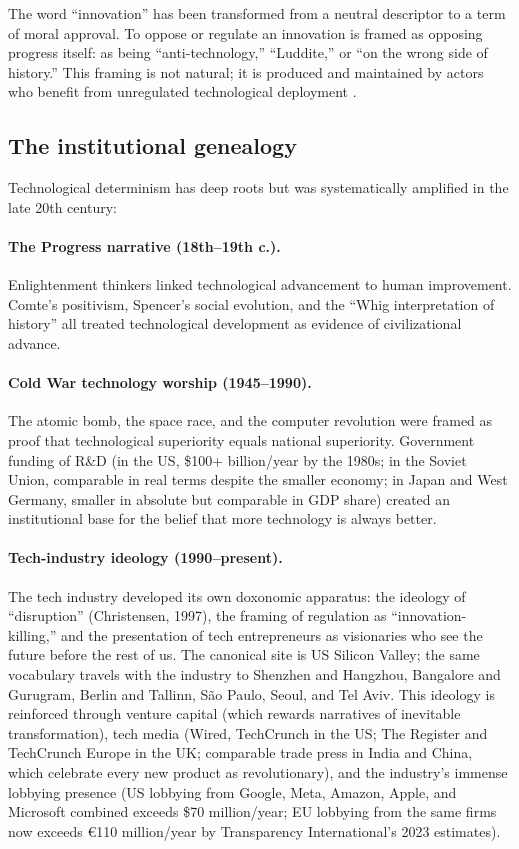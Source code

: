 The word ``innovation'' has been transformed from a neutral descriptor to a term of moral approval.
To oppose or regulate an innovation is framed as opposing progress itself: as being ``anti-technology,'' ``Luddite,'' or ``on the wrong side of history.''
This framing is not natural; it is produced and maintained by actors who benefit from unregulated technological deployment \autocite{winner1986}.

\subsection{The institutional genealogy}

Technological determinism has deep roots but was systematically amplified in the late 20th century:

\paragraph{The Progress narrative (18th--19th c.).}
Enlightenment thinkers linked technological advancement to human improvement.
Comte's positivism, Spencer's social evolution, and the ``Whig interpretation of history'' all treated technological development as evidence of civilizational advance.

\paragraph{Cold War technology worship (1945--1990).}
The atomic bomb, the space race, and the computer revolution were framed as proof that technological superiority equals national superiority.
Government funding of R\&D (in the US, \$100+ billion/year by the 1980s; in the Soviet Union, comparable in real terms despite the smaller economy; in Japan and West Germany, smaller in absolute but comparable in GDP share) created an institutional base for the belief that more technology is always better.

\paragraph{Tech-industry ideology (1990--present).}
The tech industry developed its own doxonomic apparatus: the ideology of ``disruption'' (Christensen, 1997), the framing of regulation as ``innovation-killing,'' and the presentation of tech entrepreneurs as visionaries who see the future before the rest of us. The canonical site is US Silicon Valley; the same vocabulary travels with the industry to Shenzhen and Hangzhou, Bangalore and Gurugram, Berlin and Tallinn, S{\~a}o Paulo, Seoul, and Tel Aviv.
This ideology is reinforced through venture capital (which rewards narratives of inevitable transformation), tech media (Wired, TechCrunch in the US; The Register and TechCrunch Europe in the UK; comparable trade press in India and China, which celebrate every new product as revolutionary), and the industry's immense lobbying presence (US lobbying from Google, Meta, Amazon, Apple, and Microsoft combined exceeds \$70 million/year; EU lobbying from the same firms now exceeds €110 million/year by Transparency International's 2023 estimates).

